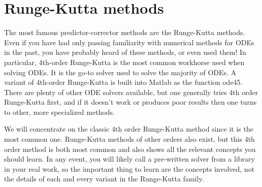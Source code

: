 \documentclass[hidelinks,notitlepage]{book}
\begin{document}
\section{Runge-Kutta methods}
\label{sect:RK4}
The most famous predictor-corrector methods are the Runge-Kutta methods.  Even if you have had only passing familiarity with numerical methods for ODEs in the past, you have probably heard of these methods, or even used them!  In particular, 4th-order Runge-Kutta is the most common workhorse used when solving ODEs.  It is the go-to solver used to solve the majority of ODEs.  A variant of 4th-order Runge-Kutta is built into Matlab as the function ode45.  There are plenty of other ODE solvers available, but one generally tries 4th order Runge-Kutta first, and if it doesn't work or produces poor results then one turns to other, more specialized methods.

We will concentrate on the classic 4th order Runge-Kutta method since it is the most common one.  Runge-Kutta methods of other orders also exist, but this 4th order method is both most common and also shows all the relevant concepts you should learn.  In any event, you will likely call a pre-written solver from a library in your real work, so the important thing to learn are the concepts involved, not the details of each and every variant in the Runge-Kutta family.
\end{document}
